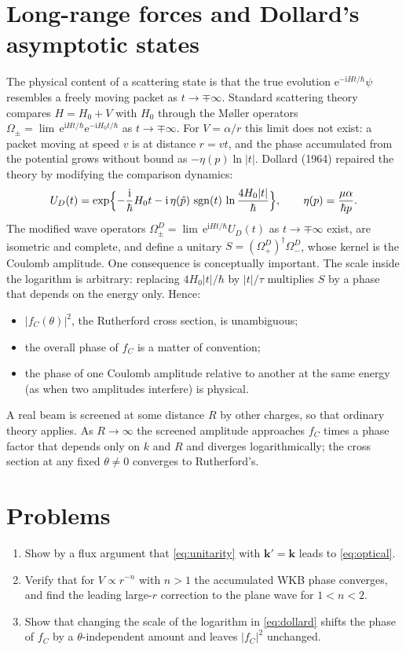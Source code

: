 \documentclass[11pt,a4paper]{book}
\numberwithin{equation}{chapter}
\newcommand{\ii}{\mathrm{i}}
\newcommand{\ee}{\mathrm{e}}
\newcommand{\vk}{\bm{k}}
\newcommand{\sgn}{\operatorname{sgn}}
\begin{document}
\section{Long-range forces and Dollard's asymptotic states}\label{sec:dollard}

The physical content of a scattering state is that the true evolution
$\ee^{-\ii Ht/\hbar}\psi$ resembles a freely moving packet as $t\to\mp\infty$.
Standard scattering theory compares $H=H_0+V$ with $H_0$ through the
M{\o}ller operators
$\Omega_\pm=\lim\,\ee^{\ii Ht/\hbar}\ee^{-\ii H_0t/\hbar}$ as $t\to\mp\infty$.
For $V=\alpha/r$ this limit does not exist: a packet moving at speed $v$ is at
distance $r=vt$, and the phase accumulated from the potential grows without
bound as $-\eta(p)\ln|t|$. Dollard (1964) repaired the theory by modifying the
comparison dynamics:
\begin{equation}\label{eq:dollard}
  U_D(t)=\exp\Bigl\{-\frac{\ii}{\hbar}H_0t-\ii\,\eta(\hat p)\,\sgn(t)\,
  \ln\frac{4H_0|t|}{\hbar}\Bigr\},\qquad \eta(p)=\frac{\mu\alpha}{\hbar p}.
\end{equation}
The modified wave operators
$\Omega^D_\pm=\lim\,\ee^{\ii Ht/\hbar}U_D(t)$ as $t\to\mp\infty$ exist, are
isometric and complete, and define a unitary
$S=(\Omega^D_+)^\dagger\Omega^D_-$, whose kernel is the Coulomb amplitude. One
consequence is conceptually important. The scale inside the logarithm is
arbitrary: replacing $4H_0|t|/\hbar$ by $|t|/\tau$ multiplies $S$ by a phase
that depends on the energy only. Hence:
\begin{itemize}
  \item $|f_C(\theta)|^2$, the Rutherford cross section, is unambiguous;
  \item the overall phase of $f_C$ is a matter of convention;
  \item the phase of one Coulomb amplitude relative to another at the same
        energy (as when two amplitudes interfere) is physical.
\end{itemize}
A real beam is screened at some distance $R$ by other charges, so that ordinary
theory applies. As $R\to\infty$ the screened amplitude approaches $f_C$ times a
phase factor that depends only on $k$ and $R$ and diverges logarithmically; the
cross section at any fixed $\theta\neq0$ converges to Rutherford's.

\section{Problems}
\begin{enumerate}
  \item Show by a flux argument that \eqref{eq:unitarity} with $\vk'=\vk$ leads
        to \eqref{eq:optical}.
  \item Verify that for $V\propto r^{-n}$ with $n>1$ the accumulated WKB phase
        converges, and find the leading large-$r$ correction to the plane wave
        for $1<n<2$.
  \item Show that changing the scale of the logarithm in \eqref{eq:dollard}
        shifts the phase of $f_C$ by a $\theta$-independent amount and leaves
        $|f_C|^2$ unchanged.
\end{enumerate}
\end{document}
